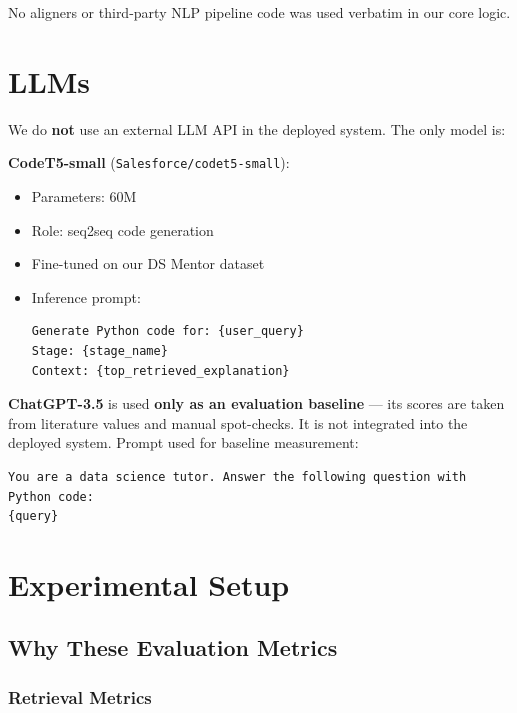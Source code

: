 \documentclass[12pt,a4paper]{article}
\begin{document}
No aligners or third-party NLP pipeline code was used verbatim in our core logic.

\section{LLMs}

We do \textbf{not} use an external LLM API in the deployed system. The only model is:

\textbf{CodeT5-small} (\texttt{Salesforce/codet5-small}):
\begin{itemize}[leftmargin=*]
  \item Parameters: 60M
  \item Role: seq2seq code generation
  \item Fine-tuned on our DS Mentor dataset
  \item Inference prompt:
\begin{lstlisting}[language={}]
Generate Python code for: {user_query}
Stage: {stage_name}
Context: {top_retrieved_explanation}
\end{lstlisting}
\end{itemize}

\textbf{ChatGPT-3.5} is used \textbf{only as an evaluation baseline} --- its scores are taken from literature values and manual spot-checks. It is not integrated into the deployed system. Prompt used for baseline measurement:
\begin{lstlisting}[language={}]
You are a data science tutor. Answer the following question with Python code:
{query}
\end{lstlisting}

\section{Experimental Setup}

\subsection{Why These Evaluation Metrics}

\subsubsection{Retrieval Metrics}
\end{document}
